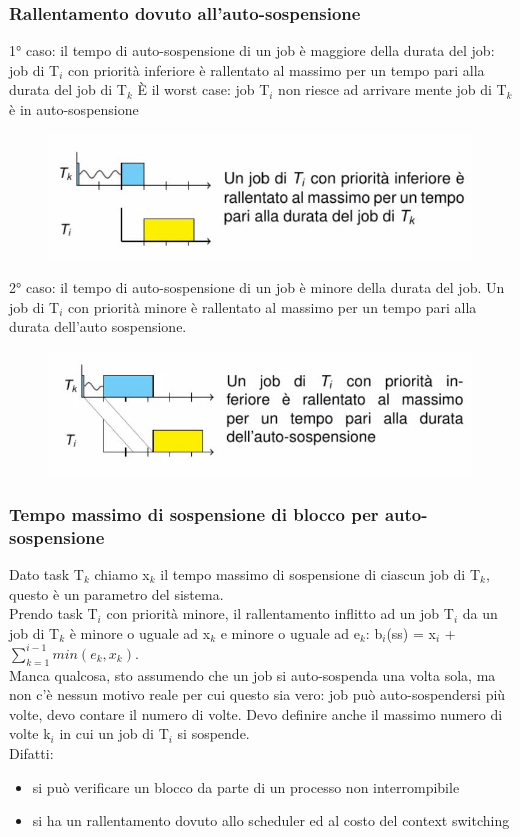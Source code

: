 \documentclass[12pt, oneside]{extbook}
\begin{document}
\subsubsection{Rallentamento dovuto all'auto-sospensione}
1° caso: il tempo di auto-sospensione di un job è maggiore della durata del job: job di T$_{i}$ con priorità inferiore è rallentato al massimo per un tempo pari alla durata del job di T$_{k}$ È il worst case: job T$_{i}$ non riesce ad arrivare mente job di T$_{k}$ è in auto-sospensione\\
\begin{figure}[!h]
\centering
\includegraphics[scale=0.4]{immagini/image-005.jpg}
\end{figure}
2° caso: il tempo di auto-sospensione di un job è minore della durata del job. Un job di T$_{i}$ con priorità minore è rallentato al massimo per un tempo pari alla durata dell'auto sospensione.\\
\begin{figure}[!h]
\centering
\includegraphics[scale=0.4]{immagini/image-006.jpg}
\end{figure}
\subsubsection{Tempo massimo di sospensione di blocco per auto-sospensione}
Dato task T$_{k}$ chiamo x$_{k}$ il tempo massimo di sospensione di ciascun job di T$_{k}$, questo è un parametro del sistema.\\ Prendo task T$_{i}$ con priorità minore, il rallentamento inflitto ad un job T$_{i}$ da un job di T$_{k}$ è minore o uguale ad x$_{k}$ e minore o uguale ad e$_{k}$:
b$_{i}$(ss) = x$_{i}$ + $\sum\limits_{k = 1}^{i-1}min(e_{k}, x_{k})$.\\ Manca qualcosa, sto assumendo che un job si auto-sospenda una volta sola, ma non c'è nessun motivo reale per cui questo sia vero: job può auto-sospendersi più volte, devo contare il numero di volte. Devo definire anche il massimo numero di volte k$_{i}$ in cui un job di T$_{i}$ si sospende.\\ Difatti:
\begin{itemize}
\item si può verificare un blocco da parte di un processo non interrompibile
\item si ha un rallentamento dovuto allo scheduler ed al costo del context switching
\end{itemize}
\end{document}

